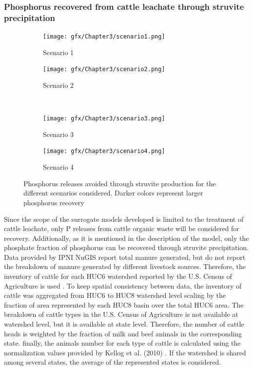 \begin{refsection}[referencesCh3]
\subsubsection{Phosphorus recovered from cattle leachate through struvite precipitation}
\begin{figure}
	\begin{subfigure}[t]{0.49\textheight}
		\texttt{[image: gfx/Chapter3/scenario1.png]}
		\caption{Scenario 1}
		\label{fig:scenario1}
	\end{subfigure}
	\begin{subfigure}[t]{0.49\textheight}
		\texttt{[image: gfx/Chapter3/scenario2.png]} 
		\caption{Scenario 2}
		\label{fig:scenario2}
	\end{subfigure}
	\\
	\begin{subfigure}[t]{0.49\textheight}
		\texttt{[image: gfx/Chapter3/scenario3.png]}
		\caption{Scenario 3}
		\label{fig:scenario3}
	\end{subfigure}
	\begin{subfigure}[t]{0.49\textheight}
		\texttt{[image: gfx/Chapter3/scenario4.png]}
		\caption{Scenario 4}
		\label{fig:scenario4}
	\end{subfigure}
	
	\caption{Phosphorus releases avoided through struvite production for the different scenarios considered. Darker colors represent larger phosphorus recovery}
	\label{fig:plot_scenariosPaperGeo}
\end{figure}

Since the scope of the surrogate models developed is limited to the treatment of cattle leachate, only P releases from cattle organic waste will be considered for recovery. Additionally, as it is mentioned in the description of the model, only the phosphate fraction of phosphorus can be recovered through struvite precipitation. Data provided by IPNI NuGIS \citep{NuGIS} report total manure generated, but do not report the breakdown of manure generated by different livestock sources. Therefore, the inventory of cattle for each HUC6 watershed reported by the U.S. Census of Agriculture is used \citep{2017CensusofAgriculture}. To keep spatial consistency between data, the inventory of cattle was aggregated from HUC6 to HUC8 watershed level scaling by the fraction of area represented by each HUC8 basin over the total HUC6 area. The breakdown of cattle types in the U.S. Census of Agriculture is not available at watershed level, but it is available at state level. Therefore, the number of cattle heads is weighted by the fraction of milk and beef animals in the corresponding state. finally, the animals number for each type of cattle is calculated using the normalization values provided by Kellog et al. (2010) \citep{Kellog2000}. If the watershed is shared among several states, the average of the represented states is considered.


\end{refsection}
